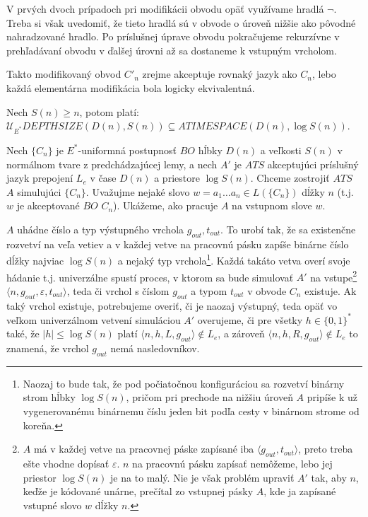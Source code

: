 {\begin{dokaz}
V prvých dvoch prípadoch pri modifikácii obvodu opäť využívame
hradlá $\neg$. Treba si však uvedomiť, že tieto hradlá sú v obvode
o úroveň nižšie ako pôvodné nahradzované hradlo. Po príslušnej
úprave obvodu pokračujeme rekurzívne v prehľadávaní obvodu v
ďalšej úrovni až sa dostaneme k vstupným vrcholom.

Takto modifikovaný obvod $C'_n$ zrejme akceptuje rovnaký jazyk ako
$C_n$, lebo každá elementárna modifikácia bola logicky
ekvivalentná.
\end{dokaz}

\begin{veta}
Nech $S(n)\geq n$, potom platí:
\\ $\mathcal{U}_{E^*}DEPTHSIZE(D(n),S(n))\subseteq
ATIMESPACE(D(n),\log S(n))$.
\end{veta}

\begin{dokaz}
Nech $\{ C_n\}$ je $E^*$-uniformná postupnosť $BO$ hĺbky $D(n)$ a
veľkosti $S(n)$ v normálnom tvare z predchádzajúcej lemy, a nech
$A'$ je $ATS$ akceptujúci príslušný jazyk prepojení $L_e$ v čase
$D(n)$ a priestore $\log S(n)$. Chceme zostrojiť $ATS$ $A$
simulujúci $\{ C_n\}$. Uvažujme nejaké slovo $w=a_1\dots a_n\in
L(\{ C_n\})$ dĺžky $n$ (t.j. $w$ je akceptované $BO$ $C_n$).
Ukážeme, ako pracuje $A$ na vstupnom slove $w$.

$A$ uhádne číslo a typ výstupného vrchola $g_{out},t_{out}$. To
urobí tak, že sa existenčne rozvetví na veľa vetiev a v každej
vetve na pracovnú pásku zapíše binárne číslo dĺžky najviac $\log
S(n)$ a nejaký typ vrchola\footnote{Naozaj to bude tak, že pod
počiatočnou konfiguráciou sa rozvetví binárny strom hĺbky $\log
S(n)$, pričom pri prechode na nižšiu úroveň $A$ pripíše k už
vygenerovanému binárnemu číslu jeden bit podľa cesty v binárnom
strome od koreňa.}. Každá takáto vetva overí svoje hádanie t.j.
univerzálne spustí proces, v ktorom sa bude simulovať $A'$ na
vstupe\footnote{$A$ má v každej vetve na pracovnej páske zapísané
iba $\langle g_{out},t_{out}\rangle $, preto treba ešte vhodne
dopísať $\varepsilon$. $n$ na pracovnú pásku zapísať nemôžeme,
lebo jej priestor $\log S(n)$ je na to malý. Nie je však problém
upraviť $A'$ tak, aby $n$, keďže je kódované unárne, prečítal zo
vstupnej pásky $A$, kde ja zapísané vstupné slovo $w$ dĺžky $n$.}
$\langle n,g_{out},\varepsilon,t_{out}\rangle $, teda či vrchol s
číslom $g_{out}$ a typom $t_{out}$ v obvode $C_n$ existuje. Ak
taký vrchol existuje, potrebujeme overiť, či je naozaj výstupný,
teda opäť vo veľkom univerzálnom vetvení simuláciou $A'$
overujeme, či pre všetky $h\in\{ 0,1\}^*$ také, že $|h|\leq\log
S(n)$ platí $\langle n,h,L,g_{out}\rangle \not\in L_e$, a zároveň
$\langle n,h,R,g_{out}\rangle \not\in L_e$ to znamená, že vrchol
$g_{out}$ nemá nasledovníkov.


\end{dokaz}}
